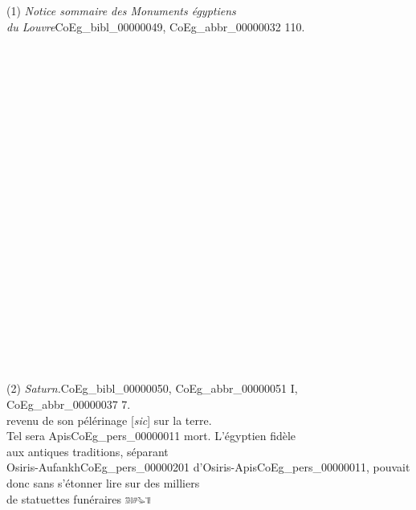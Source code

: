 \documentclass{book}
\begin{document}
{\begin{paracol}{2}
\noindent \\
\\
\\
\\
\\
\\
\\
\\
\\
\\
\\
\\
(1) \textit{Notice sommaire des Monuments égyptiens\\
du Louvre}\gls{CoEg_bibl_00000049}, \gls{CoEg_abbr_00000032} 110.\\
\\
\\
\\
\\
\\
\\
\\
\\
\\
\\
\\
\\
\\
\\
\\
\\
\\
\\
\\
\\
\\
\\
(2) \textit{Saturn.}\gls{CoEg_bibl_00000050}, \gls{CoEg_abbr_00000051} I, \gls{CoEg_abbr_00000037} 7.\\
\switchcolumn
\noindent revenu de son pélérinage [\textit{sic}] sur la terre.\\
Tel sera Apis\gls{CoEg_pers_00000011} mort. L’égyptien fidèle\\
aux antiques traditions, séparant\\
Osiris-Aufankh\gls{CoEg_pers_00000201} d’Osiris-Apis\gls{CoEg_pers_00000011}, pouvait\\
donc sans s’étonner lire sur des milliers\\
de statuettes funéraires \includegraphics[height=6pt]{CoEg_Mariette_hiero_1857-04-01_19_1.png}\\

\end{paracol}}
\end{document}
